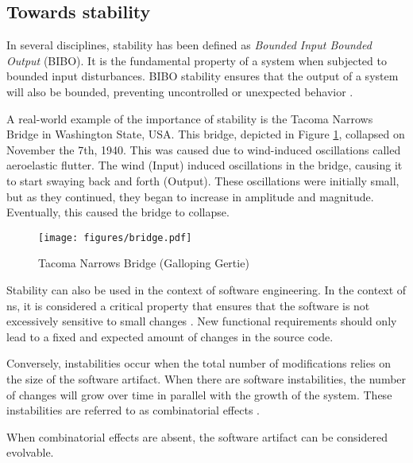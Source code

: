 \subsection{Towards stability} \label{subsec_on_stability}

In several disciplines, stability has been defined as \emph{Bounded Input Bounded Output}
(BIBO). It is the fundamental property of a system when subjected to bounded input
disturbances. BIBO stability ensures that the output of a system will also be bounded,
preventing uncontrolled or unexpected behavior \parencite[270]{mannaert_normalized_2016}. 

A real-world example of the importance of stability is the Tacoma Narrows Bridge in
Washington State, USA. This bridge, depicted in Figure \ref*{fig_bridge}, collapsed on
November the 7th, 1940. This was caused due to wind-induced oscillations called
aeroelastic flutter. The wind (Input) induced oscillations in the bridge, causing it to
start swaying back and forth (Output). These oscillations were initially small, but as
they continued, they began to increase in amplitude and magnitude. Eventually, this 
caused the bridge to collapse.

\begin{figure}[H]
    \centering
    \texttt{[image: figures/bridge.pdf]}
    \caption[Tacoma Narrows Bridge]{Tacoma Narrows Bridge (Galloping Gertie)}
    \label{fig_bridge}
\end{figure}

Stability can also be used in the context of software engineering. In the context of
\gls{ns}, it is considered a critical property that ensures that the software is not
excessively sensitive to small changes \parencite[270]{mannaert_normalized_2016}. New
functional requirements should only lead to a fixed and expected amount of changes in
the source code. 

Conversely, instabilities occur when the total number of modifications relies on the size
of the software artifact. When there are software instabilities, the number of changes
will grow over time in parallel with the growth of the system. These instabilities are
referred to as combinatorial effects \parencite[270]{mannaert_normalized_2016}. 

When combinatorial effects are absent, the software artifact can be considered evolvable.